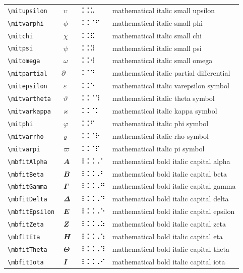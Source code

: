 \documentclass[oneside]{article}
\begin{document}
\begin{longtable}{llll}
\verb|\mitupsilon| & $\mitupsilon$ &  ⠨⠨⠥  & {mathematical italic small upsilon} \\[2ex]
\verb|\mitvarphi| & $\mitvarphi$ &  ⠨⠨⠈⠋  & {mathematical italic small phi} \\[2ex]
\verb|\mitchi| & $\mitchi$ &  ⠨⠨⠯  & {mathematical italic small chi} \\[2ex]
\verb|\mitpsi| & $\mitpsi$ &  ⠨⠨⠽  & {mathematical italic small psi} \\[2ex]
\verb|\mitomega| & $\mitomega$ &  ⠨⠨⠺  & {mathematical italic small omega} \\[2ex]
\verb|\mitpartial| & $\mitpartial$ &  ⠨⠈⠙  & {mathematical italic partial differential} \\[2ex]
\verb|\mitepsilon| & $\mitepsilon$ &  ⠨⠨⠑  & {mathematical italic varepsilon symbol} \\[2ex]
\verb|\mitvartheta| & $\mitvartheta$ &  ⠨⠨⠈⠹  & {mathematical italic theta symbol} \\[2ex]
\verb|\mitvarkappa| & $\mitvarkappa$ &  ⠨⠨⠈⠅  & {mathematical italic kappa symbol} \\[2ex]
\verb|\mitphi| & $\mitphi$ &  ⠨⠨⠋  & {mathematical italic phi symbol} \\[2ex]
\verb|\mitvarrho| & $\mitvarrho$ &  ⠨⠨⠈⠗  & {mathematical italic rho symbol} \\[2ex]
\verb|\mitvarpi| & $\mitvarpi$ &  ⠨⠨⠈⠏  & {mathematical italic pi symbol} \\[2ex]
\verb|\mbfitAlpha| & $\mbfitAlpha$ &  ⠸⠨⠨⠠⠁  & {mathematical bold italic capital alpha} \\[2ex]
\verb|\mbfitBeta| & $\mbfitBeta$ &  ⠸⠨⠨⠠⠃  & {mathematical bold italic capital beta} \\[2ex]
\verb|\mbfitGamma| & $\mbfitGamma$ &  ⠸⠨⠨⠠⠛  & {mathematical bold italic capital gamma} \\[2ex]
\verb|\mbfitDelta| & $\mbfitDelta$ &  ⠸⠨⠨⠠⠙  & {mathematical bold italic capital delta} \\[2ex]
\verb|\mbfitEpsilon| & $\mbfitEpsilon$ &  ⠸⠨⠨⠠⠑  & {mathematical bold italic capital epsilon} \\[2ex]
\verb|\mbfitZeta| & $\mbfitZeta$ &  ⠸⠨⠨⠠⠵  & {mathematical bold italic capital zeta} \\[2ex]
\verb|\mbfitEta| & $\mbfitEta$ &  ⠸⠨⠨⠠⠱  & {mathematical bold italic capital eta} \\[2ex]
\verb|\mbfitTheta| & $\mbfitTheta$ &  ⠸⠨⠨⠠⠹  & {mathematical bold italic capital theta} \\[2ex]
\verb|\mbfitIota| & $\mbfitIota$ &  ⠸⠨⠨⠠⠊  & {mathematical bold italic capital iota} \\[2ex]

\end{longtable}
\end{document}
